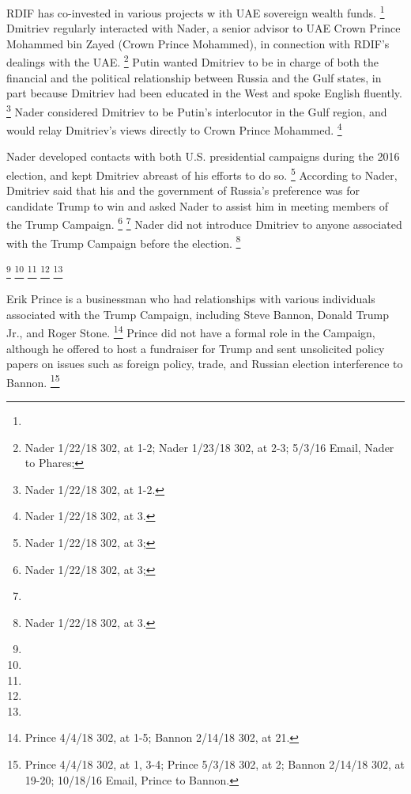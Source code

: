 RDIF has co-invested in various projects w ith UAE sovereign wealth funds.%
\footnote{}
Dmitriev regularly interacted with Nader, a senior advisor to UAE Crown Prince Mohammed bin Zayed (Crown Prince Mohammed), in connection with RDIF's dealings with the UAE.%
\footnote{Nader 1/22/18 302, at 1-2;
Nader 1/23/18 302, at 2-3;
5/3/16 Email, Nader to Phares;
}
Putin wanted Dmitriev to be in charge of both the financial and the political relationship between Russia and the Gulf states, in part because Dmitriev had been educated in the West and spoke English fluently.%
\footnote{Nader 1/22/18 302, at 1-2.}
Nader considered Dmitriev to be Putin's interlocutor in the Gulf region, and would relay Dmitriev's views directly to Crown Prince Mohammed.%
\footnote{Nader 1/22/18 302, at 3.}

Nader developed contacts with both U.S. presidential campaigns during the 2016 election, and kept Dmitriev abreast of his efforts to do so.%
\footnote{Nader 1/22/18 302, at 3; }
According to Nader, Dmitriev said that his and the government of Russia's preference was for candidate Trump to win and asked Nader to assist him in meeting members of the Trump Campaign.%
\footnote{Nader 1/22/18 302, at 3; }
\footnote{}
Nader did not introduce Dmitriev to anyone associated with the Trump Campaign before the election.%
\footnote{Nader 1/22/18 302, at 3.}

\footnote{}
\footnote{}
\footnote{}
\footnote{}
\footnote{}

Erik Prince is a businessman who had relationships with various individuals associated with the Trump Campaign, including Steve Bannon, Donald Trump Jr., and Roger Stone.%
\footnote{Prince 4/4/18 302, at 1-5;
Bannon 2/14/18 302, at 21.}
Prince did not have a formal role in the Campaign, although he offered to host a fundraiser for Trump and sent unsolicited policy papers on issues such as foreign policy, trade, and Russian election interference to Bannon.%
\footnote{Prince 4/4/18 302, at 1, 3-4;
Prince 5/3/18 302, at 2;
Bannon 2/14/18 302, at 19-20;
10/18/16 Email, Prince to Bannon.}

